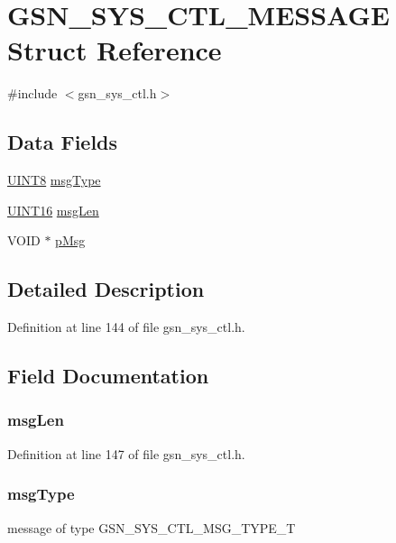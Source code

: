 \hypertarget{a00252}{
\section{GSN\_\-SYS\_\-CTL\_\-MESSAGE Struct Reference}
\label{a00252}
}


{\ttfamily \#include $<$gsn\_\-sys\_\-ctl.h$>$}

\subsection*{Data Fields}
\begin{DoxyCompactItemize}
\item 
\hyperlink{a00660_gab27e9918b538ce9d8ca692479b375b6a}{UINT8} \hyperlink{a00252_acee60b42983102a03741e92135ec2ef4}{msgType}
\item 
\hyperlink{a00660_ga09f1a1fb2293e33483cc8d44aefb1eb1}{UINT16} \hyperlink{a00252_af4f59052b2ee830330fcdc59991f4822}{msgLen}
\item 
VOID $\ast$ \hyperlink{a00252_a115621dd56e7c469fd9324a45ae055c0}{pMsg}
\end{DoxyCompactItemize}


\subsection{Detailed Description}


Definition at line 144 of file gsn\_\-sys\_\-ctl.h.



\subsection{Field Documentation}
\hypertarget{a00252_af4f59052b2ee830330fcdc59991f4822}{
\subsubsection[{msgLen}]{ {\bf msgLen}}}
\label{a00252_af4f59052b2ee830330fcdc59991f4822}


Definition at line 147 of file gsn\_\-sys\_\-ctl.h.

\hypertarget{a00252_acee60b42983102a03741e92135ec2ef4}{
\subsubsection[{msgType}]{ {\bf msgType}}}
\label{a00252_acee60b42983102a03741e92135ec2ef4}
message of type GSN\_\-SYS\_\-CTL\_\-MSG\_\-TYPE\_\-T 

